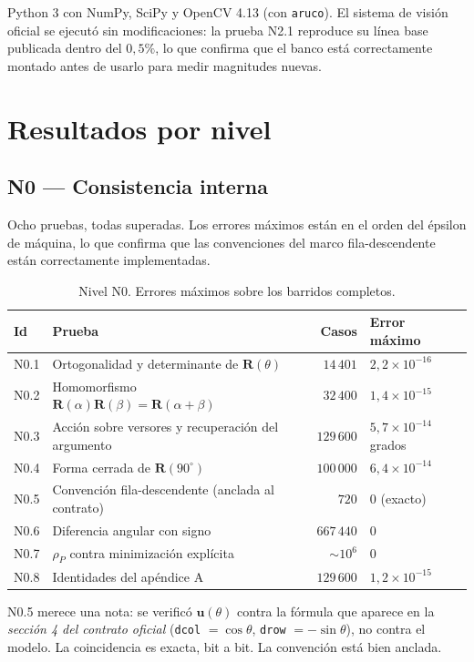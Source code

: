 \documentclass[11pt,a4paper]{article}
\newcommand{\grados}{^{\circ}}
\begin{document}
Python 3 con NumPy, SciPy y OpenCV 4.13 (con \texttt{aruco}). El sistema de visión
oficial se ejecutó sin modificaciones: la prueba N2.1 reproduce su línea base publicada
dentro del $0{,}5\%$, lo que confirma que el banco está correctamente montado antes de
usarlo para medir magnitudes nuevas.

\section{Resultados por nivel}

\subsection{N0 --- Consistencia interna}

Ocho pruebas, todas superadas. Los errores máximos están en el orden del épsilon de
máquina, lo que confirma que las convenciones del marco fila-descendente están
correctamente implementadas.

\begin{table}[htbp]
\centering
\small
\caption{Nivel N0. Errores máximos sobre los barridos completos.}
\begin{tabular}{llrl}
\toprule
Id & Prueba & Casos & Error máximo \\
\midrule
N0.1 & Ortogonalidad y determinante de $\mathbf R(\theta)$ & $14\,401$ & $2{,}2\times10^{-16}$ \\
N0.2 & Homomorfismo $\mathbf R(\alpha)\mathbf R(\beta)=\mathbf R(\alpha+\beta)$ & $32\,400$ & $1{,}4\times10^{-15}$ \\
N0.3 & Acción sobre versores y recuperación del argumento & $129\,600$ & $5{,}7\times10^{-14}$ grados \\
N0.4 & Forma cerrada de $\mathbf R(90\grados)$ & $100\,000$ & $6{,}4\times10^{-14}$ \\
N0.5 & Convención fila-descendente (anclada al contrato) & $720$ & $0$ (exacto) \\
N0.6 & Diferencia angular con signo & $667\,440$ & $0$ \\
N0.7 & $\rho_P$ contra minimización explícita & $\sim10^{6}$ & $0$ \\
N0.8 & Identidades del apéndice A & $129\,600$ & $1{,}2\times10^{-15}$ \\
\bottomrule
\end{tabular}
\end{table}

N0.5 merece una nota: se verificó $\mathbf u(\theta)$ contra la fórmula que aparece en
la \emph{sección 4 del contrato oficial} (\texttt{dcol} $=\cos\theta$,
\texttt{drow} $=-\sin\theta$), no contra el modelo. La coincidencia es exacta, bit a
bit. La convención está bien anclada.
\end{document}
